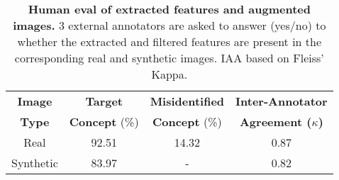 \begin{table}[H]
\vspace{-0.2em}
\centering
\small\addtolength{\tabcolsep}{-0.85pt}
    \begin{tabular}{c|ccc}
    \toprule
    
    \textbf{Image}
    & {\textbf{Target}}                   & {\textbf{Misidentified}} & \textbf{Inter-Annotator} \\
    \textbf{Type}
    & {\textbf{Concept} (\%)}                   & {\textbf{Concept} (\%)} & \textbf{Agreement ($\kappa$)} \\

    \midrule 
    Real             &  92.51    & 14.32  & 0.87 \\
    Synthetic        & 83.97     & -      & 0.82 \\
    \bottomrule
    \end{tabular}
\vspace{-0.5em}
\caption{
\footnotesize
\textbf{Human eval of extracted features and augmented images.} 3 external annotators are asked to answer (yes/no) to whether the extracted and filtered features are present in the corresponding real and synthetic images. IAA based on Fleiss' Kappa.
}
\vspace{-0.5em}
\label{tab:human_eval}
\end{table}